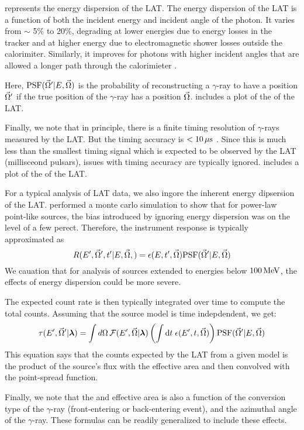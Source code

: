 \edisp represents the energy dispersion of the LAT.  The energy dispersion
of the LAT is a function of both the incident energy and incident angle
of the photon. It varies from $\sim$ 5\% to 20\%, degrading at lower
energies due to energy losses in the tracker and at higher energy due
to electromagnetic shower losses outside the calorimiter. Similarly,
it improves for photons with higher incident angles that are allowed a
longer path through the calorimieter \citep{ackermann_2012a_fermi-large}.

Here, $\text{PSF}(\vec\Omega'|E,\vec\Omega)$ is the probability of
reconstructing a $\gamma$-ray to have a position $\vec\Omega'$ if
the true position of the $\gamma$-ray has a position $\vec\Omega$.
 includes a plot of the \psf of the \ac{LAT}.


Finally, we note that in principle, there is a finite timing resolution
of $\gamma$-rays measured by the \ac{LAT}. But the timing accuracy is
$<10\,\mu\text{s}$ \citep{atwood_2009a_large-telescope}. Since
this is much less than the smallest timing signal which is expected to
be observed by the \ac{LAT} (millisceond pulsars), issues with timing
accuracy are typically ignored.   includes
a plot of the \edisp of the \ac{LAT}.

For a typical analysis of \ac{LAT} data, we also ingore the inherent
energy dipsersion of the \ac{LAT}.  \cite{ackermann_2012a_fermi-large}
performed a monte carlo simulation to show that for power-law point-like
sources, the bias introduced by ignoring energy dispersion was on the
level of a few perect.  
Therefore, the instrument response is typically approximated as
\begin{equation}
  R(E',\vec\Omega',t'|E,\vec\Omega,) = 
  \epsilon(E,t',\vec\Omega) \text{PSF}(\vec\Omega'|E,\vec\Omega)
\end{equation}
We cauation that for analysis of sources extended
to energies below $100\,\text{MeV}$, the effects of energy dispersion
could be more severe.

The expected count rate is then typically integrated over time
to compute the total counts. Assuming that the source model
is time indepdendent, we get: 
\begin{equation}\eqnlabel{differential_model_counts}
  \eventrate(\energy',\solidangle'|\modelparams)
  = \int \dsolidangle \,
  \fluxdensity(\energy',\vec\Omega|\modelparams) 
\left(
\int \dtime \intspace \effectivearea(\energy',\time,\solidangle) 
\right)
\psf(\solidangle'|E,\solidangle)
\end{equation}
This equation says that the counts expected by the LAT
from a given model
is the product of the source's flux with the effective area and then
convolved with the point-spread function.

Finally, we note that the \psf and effective area is also a function of the conversion type
of the $\gamma$-ray (front-entering or back-entering event), and the azimuthal
angle of the $\gamma$-ray. These formulas can be readily generalized to include these effects.
